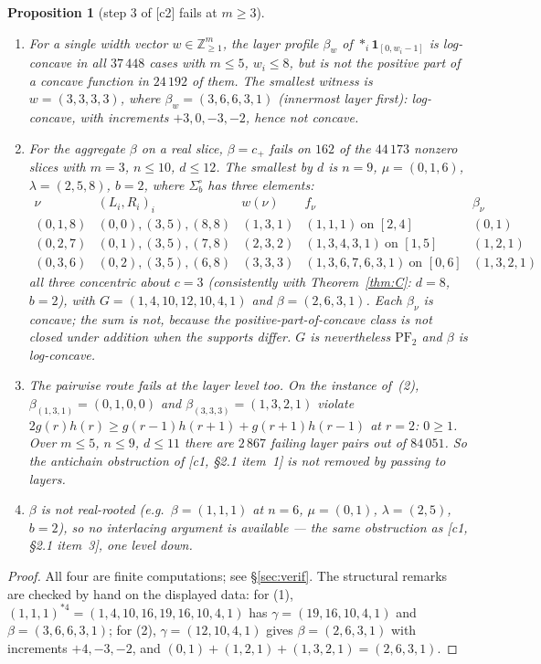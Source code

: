 \documentclass[11pt]{article}
\newtheorem{proposition}[theorem]{Proposition}
\theoremstyle{definition}
\newcommand{\Z}{\mathbb Z}
\newcommand{\PFtwo}{\mathrm{PF}_2}
\begin{document}
\begin{proposition}[step 3 of {[c2]} fails at $m\ge3$]\label{prop:dead}
\begin{enumerate}
\item For a \emph{single} width vector $w\in\Z_{\ge1}^m$, the layer profile $\beta_w$ of
$*_i\mathbf 1_{[0,w_i-1]}$ is log-concave in all $37\,448$ cases with $m\le5$, $w_i\le8$,
but is \emph{not} the positive part of a concave function in $24\,192$ of them. The
smallest witness is $w=(3,3,3,3)$, where $\beta_w=(3,6,6,3,1)$ (innermost layer first):
log-concave, with increments $+3,0,-3,-2$, hence not concave.
\item For the \emph{aggregate} $\beta$ on a real slice, $\beta=c_+$ fails on $162$ of the
$44\,173$ nonzero slices with $m=3$, $n\le10$, $d\le12$. The smallest by $d$ is $n=9$,
$\mu=(0,1,6)$, $\lambda=(2,5,8)$, $b=2$, where $\Sigma^\circ_b$ has three elements:
\[
\begin{array}{c|c|c|c|c}
 \nu & (L_i,R_i)_i & w(\nu) & f_\nu & \beta_\nu\\\hline
 (0,1,8) & (0,0),(3,5),(8,8) & (1,3,1) & (1,1,1)\ \text{on }[2,4] & (0,1)\\
 (0,2,7) & (0,1),(3,5),(7,8) & (2,3,2) & (1,3,4,3,1)\ \text{on }[1,5] & (1,2,1)\\
 (0,3,6) & (0,2),(3,5),(6,8) & (3,3,3) & (1,3,6,7,6,3,1)\ \text{on }[0,6] & (1,3,2,1)
\end{array}
\]
all three concentric about $c=3$ (consistently with Theorem~\ref{thm:C}: $d=8$, $b=2$), with
$G=(1,4,10,12,10,4,1)$ and $\beta=(2,6,3,1)$. Each $\beta_\nu$ \emph{is} concave; the sum is
not, because the positive-part-of-concave class is not closed under addition when the
supports differ. $G$ is nevertheless $\PFtwo$ and $\beta$ is log-concave.
\item The pairwise route fails at the layer level too. On the instance of~(2),
$\beta_{(1,3,1)}=(0,1,0,0)$ and $\beta_{(3,3,3)}=(1,3,2,1)$ violate
$2g(r)h(r)\ge g(r-1)h(r+1)+g(r+1)h(r-1)$ at $r=2$: $0\ge1$. Over $m\le5$, $n\le9$,
$d\le11$ there are $2\,867$ failing layer pairs out of $84\,051$. So the antichain
obstruction of [c1, §2.1 item~1] is not removed by passing to layers.
\item $\beta$ is not real-rooted (e.g.\ $\beta=(1,1,1)$ at $n=6$, $\mu=(0,1)$,
$\lambda=(2,5)$, $b=2$), so no interlacing argument is available --- the same obstruction
as [c1, §2.1 item~3], one level down.
\end{enumerate}
\end{proposition}
\begin{proof}
All four are finite computations; see §\ref{sec:verif}. The structural remarks are checked
by hand on the displayed data: for (1), $(1,1,1)^{*4}=(1,4,10,16,19,16,10,4,1)$ has
$\gamma=(19,16,10,4,1)$ and $\beta=(3,6,6,3,1)$; for (2), $\gamma=(12,10,4,1)$ gives
$\beta=(2,6,3,1)$ with increments $+4,-3,-2$, and $(0,1)+(1,2,1)+(1,3,2,1)=(2,6,3,1)$.
\end{proof}
\end{document}
